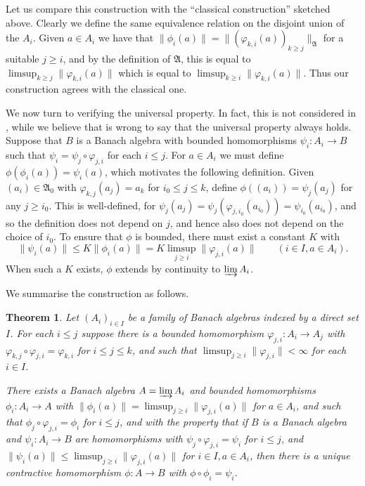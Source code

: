 \documentclass[a4paper,11pt]{article}
\newcommand{\mf}{\mathfrak}
\newcommand{\indlim}{\varinjlim}
\newtheorem{theorem}[lemma]{Theorem}
\theoremstyle{definition}
\begin{document}
Let us compare this construction with the ``classical construction'' sketched above.  Clearly we
define the same equivalence relation on the disjoint union of the $A_i$.  Given $a\in A_i$ we have
that $\|\phi_i(a)\| = \|(\varphi_{k,i}(a))_{k\geq j}\|_{\mf A}$ for a suitable $j\geq i$, and by
the definition of $\mf A$, this is equal to $\limsup_{k\geq j} \|\varphi_{k,i}(a)\|$ which is
equal to $\limsup_{k\geq i} \|\varphi_{k,i}(a)\|$.  Thus our construction agrees with the
classical one.

We now turn to verifying the universal property.  In fact, this is not considered in
\cite{blackadar}, while we believe that \cite{palmer} is wrong to say that the universal property
always holds.    Suppose that $B$ is a Banach algebra with bounded homomorphisms $\psi_i:A_i
\rightarrow B$ such that $\psi_i = \psi_j \circ \varphi_{j,i}$ for each $i\leq j$.  For $a\in A_i$
we must define $\phi(\phi_i(a)) = \psi_i(a)$, which motivates the following definition.  Given
$(a_i) \in \mf A_0$ with $\varphi_{k,j}(a_j) = a_k$ for $i_0 \leq j\leq k$, define
$\phi((a_i)) = \psi_j(a_j)$ for any $j\geq i_0$.  This is well-defined, for $\psi_j(a_j) =
\psi_j(\varphi_{j,i_0}(a_{i_0})) = \psi_{i_0}(a_{i_0})$, and so the definition does not depend on
$j$, and hence also does not depend on the choice of $i_0$.  To ensure that $\phi$ is bounded,
there must exist a constant $K$ with
\[ \|\psi_i(a)\| \leq K \|\phi_i(a)\| = K \limsup_{j\geq i} \|\varphi_{j,i}(a)\|
\qquad (i\in I, a\in A_i). \]
When such a $K$ exists, $\phi$ extends by continuity to $\indlim A_i$.

We summarise the construction as follows.

\begin{theorem}\label{thm:1}
Let $(A_i)_{i\in I}$ be a family of Banach algebras indexed by a direct set $I$.  For each
$i\leq j$ suppose there is a bounded homomorphism $\varphi_{j,i}:A_i\rightarrow A_j$ with
$\varphi_{k,j} \circ \varphi_{j,i} = \varphi_{k,i}$ for $i\leq j\leq k$, and such that
$\limsup_{j\geq i} \|\varphi_{j,i}\| < \infty$ for each $i\in I$.  

There exists a Banach algebra $A=\indlim A_i$ and bounded homomorphisms $\phi_i:A_i\rightarrow
A$ with $\|\phi_i(a)\| = \limsup_{j\geq i} \|\varphi_{j,i}(a)\|$ for $a\in A_i$, and such that
$\phi_j \circ \varphi_{j,i} = \phi_i$ for $i\leq j$,
and with the property that if $B$ is a Banach algebra and
$\psi_i:A_i\rightarrow B$ are homomorphisms with $\psi_j \circ \varphi_{j,i} = \psi_i$ for
$i\leq j$, and
$\|\psi_i(a)\| \leq \limsup_{j\geq i} \|\varphi_{j,i}(a)\|$ for $i\in I, a\in A_i$, then there is
a unique contractive homomorphism $\phi:A\rightarrow B$ with $\phi\circ\phi_i = \psi_i$.
\end{theorem}
\end{document}
